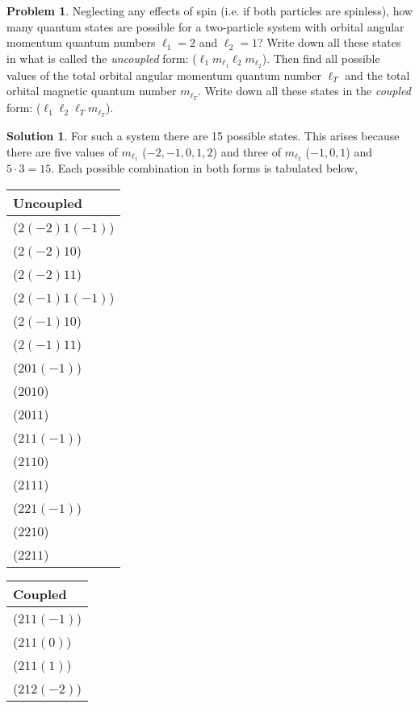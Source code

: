\documentclass[10pt]{article}
\theoremstyle{definition}
\newtheorem{problem}{Problem}
\newtheorem{soln}{Solution}
\begin{document}
\begin{problem}
Neglecting any effects of spin (i.e. if both particles are spinless), how many quantum states are possible
for a two-particle system with orbital angular momentum quantum numbers $\ell_1=2$ and $\ell_2=1$? Write down
all these states in what is called the \emph{uncoupled} form: ($\ell_1m_{\ell_1}\ell_2m_{\ell_2}$). Then find all possible values of the
total orbital angular momentum quantum number $\ell_T$ and the total orbital magnetic quantum number $m_{\ell_T}$. Write down all these states
in the \emph{coupled} form: ($\ell_1\ell_2\ell_Tm_{\ell_T}$).
\end{problem}
\begin{soln} For such a system there are 15 possible states. This arises because there are five values of $m_{\ell_1}$ ($-2,-1,0,1,2$) and
  three of $m_{\ell_2}$ ($-1,0,1$) and $5\cdot 3 = 15$. Each possible combination in both forms is tabulated below,
  \begin{table}[h!]
    \centering%
    \begin{tabular}{l}
      \toprule
      Uncoupled      \\
      \midrule
      ($2(-2)1(-1)$) \\
      ($2(-2)10$)    \\
      ($2(-2)11$)    \\
      ($2(-1)1(-1)$) \\
      ($2(-1)10$)    \\
      ($2(-1)11$)    \\
      ($201(-1)$)    \\
      ($2010$)       \\
      ($2011$)       \\
      ($211(-1)$)    \\
      ($2110$)       \\
      ($2111$)       \\
      ($221(-1)$)    \\
      ($2210$)       \\
      ($2211$)       \\
      \bottomrule
    \end{tabular}\qquad
    \begin{tabular}{l}
      \toprule
      Coupled       \\
      \midrule
      ($21 1 (-1)$) \\
      ($21 1 (0)$)  \\
      ($21 1 (1)$)  \\
      ($21 2 (-2)$) \\

\end{tabular}
\end{table}
\end{soln}
\end{document}
